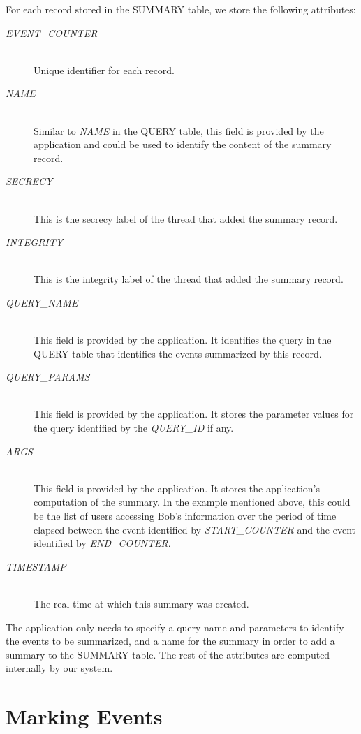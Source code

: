 For each record stored in the SUMMARY table, we store the following attributes:

\begin{description}
  \item[\emph{EVENT\_COUNTER}] \ \\
    Unique identifier for each record.
  \item[\emph{NAME}] \ \\
    Similar to \emph{NAME} in the QUERY table,
    this field is provided by the application and
    could be used to identify the content of the
    summary record.
  \item[\emph{SECRECY}] \ \\
    This is the secrecy label of the thread 
    that added the summary record.
  \item[\emph{INTEGRITY}] \ \\
    This is the integrity label of the thread 
    that added the summary record.
  \item[\emph{QUERY\_NAME}] \ \\
    This field is provided by the application.
    It identifies the query in the QUERY table
    that identifies the events summarized
    by this record.
  \item[\emph{QUERY\_PARAMS}] \ \\
    This field is provided by the application.
    It stores the parameter values for the query
    identified by the \emph{QUERY\_ID} if any.
  \item[\emph{ARGS}] \ \\
    This field is provided by the application.
    It stores the application's computation of the summary.
    In the example mentioned above, this could be the 
    list of users accessing Bob's information over the
    period of time elapsed between the event
    identified by \emph{START\_COUNTER} and the
    event identified by \emph{END\_COUNTER}.
  \item[\emph{TIMESTAMP}] \ \\
    The real time at which this summary was created.
\end{description}

\noindent
The application only needs to specify a query name and parameters to identify the events to be summarized, and a name for the summary in order to add a summary to the SUMMARY table. The rest of the attributes are computed internally by our system.

\section{Marking Events}

